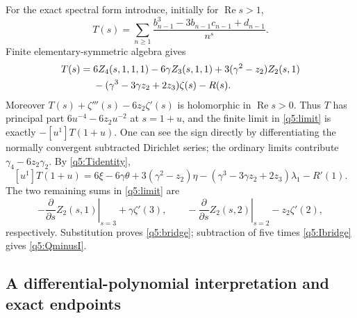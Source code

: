 \documentclass[11pt,a4paper]{article}
\numberwithin{equation}{section}
\theoremstyle{definition}
\begin{document}
For the exact spectral form introduce, initially for
$\operatorname{Re}s>1$,
\[
 T(s)=\sum_{n\geq1}
       \frac{b_{n-1}^3-3b_{n-1}c_{n-1}+d_{n-1}}{n^s}.
\]
Finite elementary-symmetric algebra gives
\begin{align}\label{q5:Tidentity}
 T(s)={}&6Z_4(s,1,1,1)-6\gamma Z_3(s,1,1)
           +3(\gamma^2-z_2)Z_2(s,1)\notag\\
 &-(\gamma^3-3\gamma z_2+2z_3)\zeta(s)-R(s).
\end{align}
Moreover $T(s)+\zeta'''(s)-6z_2\zeta'(s)$ is holomorphic in
$\operatorname{Re}s>0$.  Thus $T$ has principal part
$6u^{-4}-6z_2u^{-2}$ at $s=1+u$, and the finite limit in
\eqref{q5:limit} is exactly $-[u^1]T(1+u)$.
One can see the sign directly by differentiating the normally convergent
subtracted Dirichlet series; the ordinary limits contribute
$\gamma_4-6z_2\gamma_2$.
By \eqref{q5:Tidentity},
\[
 [u^1]T(1+u)=6\xi-6\gamma\theta+3(\gamma^2-z_2)\eta
       -(\gamma^3-3\gamma z_2+2z_3)\lambda_1-R'(1).
\]
The two remaining sums in \eqref{q5:limit} are
\[
 -\left.\frac{\partial}{\partial s}Z_2(s,1)\right|_{s=3}
          +\gamma\zeta'(3),\qquad
 -\left.\frac{\partial}{\partial s}Z_2(s,2)\right|_{s=2}
          -z_2\zeta'(2),
\]
respectively.  Substitution proves \eqref{q5:bridge}; subtraction
of five times \eqref{q5:Ibridge} gives \eqref{q5:QminusI}.

\subsection{A differential-polynomial interpretation and exact endpoints}
\end{document}
